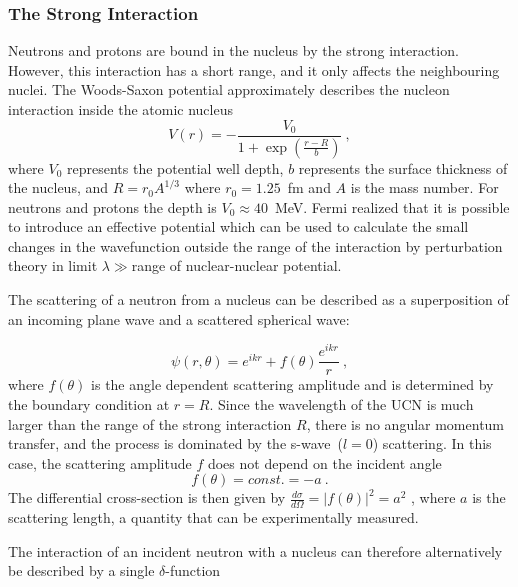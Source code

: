 \subsubsection{The Strong Interaction}
Neutrons and protons are bound in the nucleus by the strong
interaction. However, this interaction has a short range, and it only
affects the neighbouring nuclei. The Woods-Saxon potential
approximately describes the nucleon interaction inside the atomic
nucleus~\cite{WoodSaxon}
\begin{equation}
  \label{eqn:woodsax}
  V(r) = - \frac{V_0}{1+\exp(\frac{r-R}{b})}~,
\end{equation}
where $V_0$ represents the potential well depth, $b$ represents the
surface thickness of the nucleus, and $R = r_0 A^{1/3}$ where
$r_0 = 1.25$~fm and $A$ is the mass number. For neutrons and protons
the depth is $V_0 \approx 40$~MeV.
Fermi realized that it is possible to introduce an effective
potential which can be used to calculate the small changes in the
wavefunction outside the range of the interaction by perturbation
theory in limit $\lambda \gg $range of nuclear-nuclear potential.


The scattering of a neutron from a nucleus can be described as a
superposition of an incoming plane wave and a scattered spherical
wave:

\begin{equation}
  \psi(r, \theta) = e^{ikr} + f(\theta)\frac{e^{ikr}}{r}~,
\end{equation}
where $f(\theta)$ is the angle dependent scattering amplitude and is
determined by the boundary condition at $r = R$. Since the wavelength
of the UCN is much larger than the range of the strong interaction
$R$, there is no angular momentum transfer, and the process is
dominated by the s-wave~($l = 0$) scattering. In this case, the
scattering amplitude $f$ does not depend on the incident angle
\begin{equation}
f(\theta) = const. = -a~.
\end{equation}
The differential cross-section is then given by
$\frac{d\sigma}{d\Omega} = |f(\theta)|^2 = a^2$ , where $a$ is the
scattering length, a quantity that can be experimentally measured.

The interaction of an incident neutron with a nucleus can therefore
alternatively be described by a single
$\delta$-function~\cite{ucnbook}


